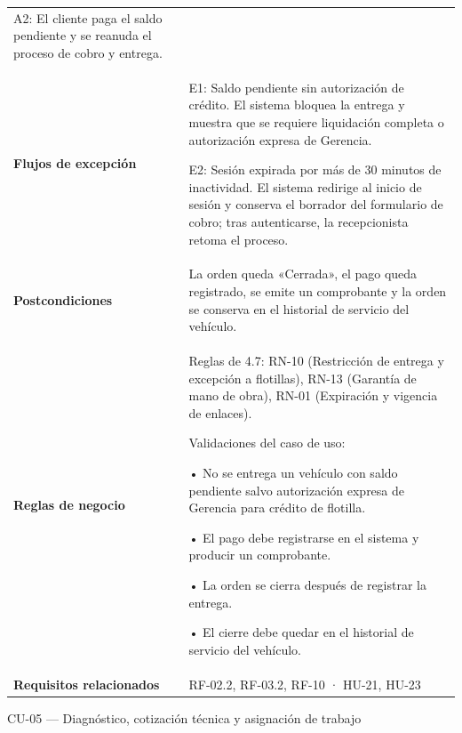 {\begin{longtable}[]{@{}
  >{\raggedright\arraybackslash}p{}
  >{\raggedright\arraybackslash}p{}@{}}
A2: El cliente paga el saldo pendiente y se reanuda el proceso de cobro
y entrega. \\
\textbf{Flujos de excepción} & E1: Saldo pendiente sin autorización de
crédito. El sistema bloquea la entrega y muestra que se requiere
liquidación completa o autorización expresa de Gerencia.

E2: Sesión expirada por más de 30 minutos de inactividad. El sistema
redirige al inicio de sesión y conserva el borrador del formulario de
cobro; tras autenticarse, la recepcionista retoma el proceso. \\
\textbf{Postcondiciones} & La orden queda «Cerrada», el pago queda
registrado, se emite un comprobante y la orden se conserva en el
historial de servicio del vehículo. \\
\textbf{Reglas de negocio} & Reglas de 4.7: RN-10 (Restricción de
entrega y excepción a flotillas), RN-13 (Garantía de mano de obra),
RN-01 (Expiración y vigencia de enlaces).

Validaciones del caso de uso:

• No se entrega un vehículo con saldo pendiente salvo autorización
expresa de Gerencia para crédito de flotilla.

• El pago debe registrarse en el sistema y producir un comprobante.

• La orden se cierra después de registrar la entrega.

• El cierre debe quedar en el historial de servicio del vehículo. \\
\textbf{Requisitos relacionados} & RF-02.2, RF-03.2, RF-10 · HU-21,
HU-23 \\
\end{longtable}
}

CU-05 --- Diagnóstico, cotización técnica y asignación de trabajo

